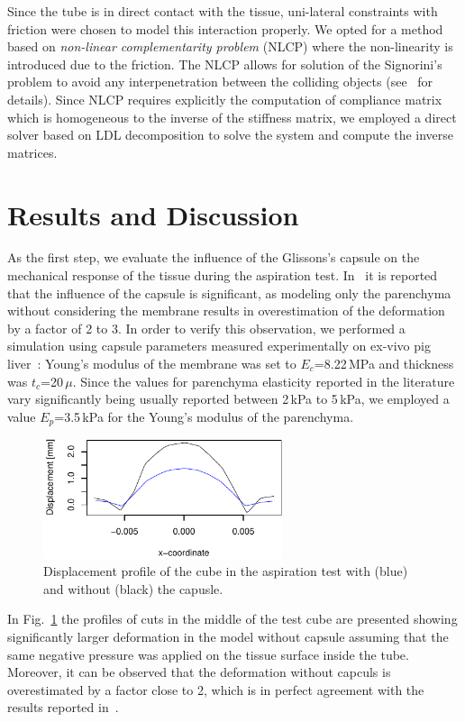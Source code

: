 \documentclass{acm_proc_article-sp}
\begin{document}
Since the tube is in direct contact with the tissue, uni-lateral constraints with friction were chosen 
to model this interaction properly. We opted for a method based on \emph{non-linear complementarity problem}  (NLCP)
where the non-linearity is introduced due to the friction. The NLCP
allows for solution of the Signorini's problem to avoid any interpenetration between the colliding 
objects (see~\cite{Duriez2006b} for details). Since NLCP requires explicitly the computation of compliance matrix which 
is homogeneous to the inverse of the stiffness matrix, we employed a direct solver based on LDL decomposition to 
solve the system and compute the inverse matrices. 


\section{Results and Discussion} %
As the first step, we evaluate the influence of the Glissons's capsule on the mechanical response of the tissue during
the aspiration test. 
In~\cite{Hollenstein2006} it is reported that the influence of the capsule is significant, as modeling 
only the parenchyma without considering the membrane results in overestimation of the deformation by a factor of 2 to 3. 
In order to verify this observation, we performed a simulation using capsule parameters measured experimentally on 
ex-vivo pig liver~\cite{Umale2011}: Young's modulus of the membrane was set to $E_c$=8.22\,MPa and thickness was
$t_c$=20\,$\mu$. 
Since the values for parenchyma elasticity reported in the literature vary significantly being usually reported between 2\,kPa to 5\,kPa, 
we employed a value $E_p$=3.5\,kPa for the Young's modulus of the parenchyma. 

\begin{figure}
  \centering
  \includegraphics[width=7cm]{aspiration.pdf}
  \caption{\label{fig-aspiration2} Displacement profile of the cube in the
  aspiration test with (blue) and without (black) the capusle.}
\end{figure}

In Fig.~\ref{fig-aspiration2} the profiles of cuts in the middle of the
test cube are presented showing significantly larger deformation in the model without capsule assuming that the same negative pressure was applied 
on the tissue surface inside the tube. Moreover, it can be observed that the deformation without capculs is overestimated by a factor 
close to 2, which is in perfect agreement with the results reported in~\cite{Hollenstein2006}.
\end{document}
